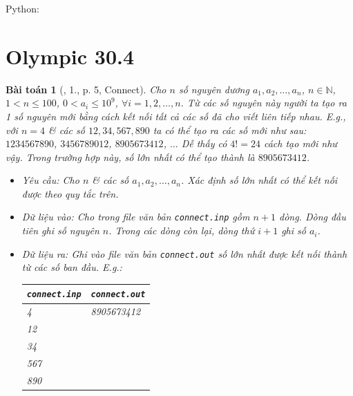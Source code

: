 \documentclass{article}
\newtheorem{baitoan}{Bài toán}
\begin{document}
Python:



\section{Olympic 30.4}

\begin{baitoan}[\cite{Olympic30-4_2010_Tin_Hoc}, 1., p. 5, Connect]
	Cho $n$ số nguyên dương $a_1,a_2,\ldots,a_n$, $n\in\mathbb{N}$, $1 < n\le100$, $0 < a_i\le10^9$, $\forall i = 1,2,\ldots,n$. Từ các số nguyên này người ta tạo ra 1 số nguyên mới bằng cách kết nối tất cả các số đã cho viết liên tiếp nhau. E.g., với $n = 4$ \& các số $12,34,567,890$ ta có thể tạo ra các số mới như sau: $1234567890$, $3456789012$, $8905673412$, $\ldots$ Dễ thấy có $4! = 24$ cách tạo mới như vậy. Trong trường hợp này, số lớn nhất có thể tạo thành là $8905673412$.
	\begin{itemize}
		\item {\sf Yêu cầu:} Cho $n$ \& các số $a_1,a_2,\ldots,a_n$. Xác định số lớn nhất có thể kết nối được theo quy tắc trên.
		\item {\sf Dữ liệu vào:} Cho trong file văn bản \verb|connect.inp| gồm $n + 1$ dòng. Dòng đầu tiên ghi số nguyên $n$. Trong các dòng còn lại, dòng thứ $i + 1$ ghi số $a_i$.
		\item \emph{Dữ liệu ra:} Ghi vào file văn bản \verb|connect.out| số lớn nhất được kết nối thành từ các số ban đầu. E.g.:
		\begin{table}[H]
			\centering
			\begin{tabular}{|l|l|}
				\hline
				{\tt connect.inp} & {\tt connect.out} \\
				\hline
				4 & 8905673412 \\
				12 &  \\
				34 &  \\
				567 &  \\
				890 &  \\
				\hline
			\end{tabular}
		\end{table}
	\end{itemize}
\end{baitoan}
\end{document}
